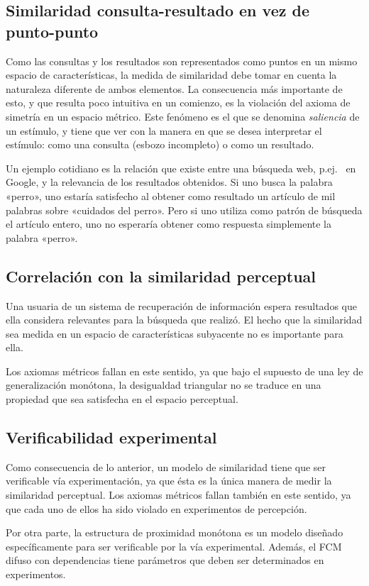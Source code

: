 \documentclass[spanish]{article}
\begin{document}
\subsection{Similaridad consulta-resultado en vez de punto-punto}
Como las consultas y los resultados son representados como puntos en un
mismo espacio de características, la medida de similaridad debe tomar en cuenta
la naturaleza diferente de ambos elementos.  La consecuencia más importante de
esto, y que resulta poco intuitiva en un comienzo, es la violación del axioma de
simetría en un espacio métrico.  Este fenómeno es el que se denomina
\emph{saliencia} de un estímulo, y tiene que ver con la manera en que se desea
interpretar el estímulo: como una consulta (esbozo incompleto) o como un resultado.

Un ejemplo cotidiano es la relación que existe entre una búsqueda web, p.ej.~%
en Google, y la relevancia de los resultados obtenidos.  Si uno busca la palabra
«perro», uno estaría satisfecho al obtener como resultado un artículo de mil
palabras sobre «cuidados del perro».  Pero si uno utiliza como patrón de
búsqueda el artículo entero, uno no esperaría obtener como respuesta simplemente
la palabra «perro».

\subsection{Correlación con la similaridad perceptual}
Una usuaria de un sistema de recuperación de información espera resultados
que ella considera relevantes para la búsqueda que realizó.  El hecho que la
similaridad sea medida en un espacio de características subyacente no es
importante para ella.

Los axiomas métricos fallan en este sentido, ya que bajo el supuesto de una ley
de generalización monótona, la desigualdad triangular no se traduce en una
propiedad que sea satisfecha en el espacio perceptual.

\subsection{Verificabilidad experimental}
Como consecuencia de lo anterior, un modelo de similaridad tiene que ser
verificable vía experimentación, ya que ésta es la única manera de medir
la similaridad perceptual.  Los axiomas métricos fallan también en este sentido, ya
que cada uno de ellos ha sido violado en experimentos de percepción.

Por otra parte, la estructura de proximidad monótona es un modelo diseñado
específicamente para ser verificable por la vía experimental.  Además, el FCM
difuso con dependencias tiene parámetros que deben ser determinados en
experimentos.
\end{document}

